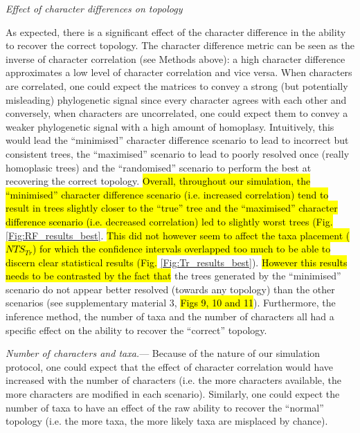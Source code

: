 \documentclass[12pt,letterpaper]{article}
\renewcommand{\subsection}[1]{%
\bigskip
\begin{center}
\begin{large}
\normalfont\itshape #1
\end{large}
\end{center}}
\renewcommand{\subsubsection}[1]{%
\vspace{2ex}
\noindent
\textit{#1.}---}
\begin{document}
\subsection{Effect of character differences on topology}
As expected, there is a significant effect of the character difference in the ability to recover the correct topology.
The character difference metric can be seen as the inverse of character correlation (see Methods above): a high character difference approximates a low level of character correlation and vice versa.
When characters are correlated, one could expect the matrices to convey a strong (but potentially misleading) phylogenetic signal since every character agrees with each other and conversely, when characters are uncorrelated, one could expect them to convey a weaker phylogenetic signal with a high amount of homoplasy.
Intuitively, this would lead the ``minimised'' character difference scenario to lead to incorrect but consistent trees, the ``maximised'' scenario to lead to poorly resolved once (really homoplasic trees) and the ``randomised'' scenario to perform the best at recovering the correct topology.
\hl{Overall, throughout our simulation, the ``minimised'' character difference scenario (i.e. increased correlation) tend to result in trees slightly closer to the ``true'' tree and the ``maximised'' character difference scenario (i.e. decreased correlation) led to slightly worst trees (Fig.}
\ref{Fig:RF_results_best}.
\hl{This did not however seem to affect the taxa placement ($NTS_{Tr}$) for which the confidence intervals overlapped too much to be able to discern clear statistical results (Fig.}
\ref{Fig:Tr_results_best}).
\hl{However this results needs to be contrasted by the fact that}
the trees generated by the ``minimised'' scenario do not appear better resolved (towards any topology) than the other scenarios (see supplementary material 3, \hl{Figs 9, 10 and 11}).
Furthermore, the inference method, the number of taxa and the number of characters all had a specific effect on the ability to recover the ``correct'' topology.

\subsubsection{Number of characters and taxa}
Because of the nature of our simulation protocol, one could expect that the effect of character correlation would have increased with the number of characters (i.e. the more characters available, the more characters are modified in each scenario).
Similarly, one could expect the number of taxa to have an effect of the raw ability to recover the ``normal'' topology (i.e. the more taxa, the more likely taxa are misplaced by chance).
\end{document}
